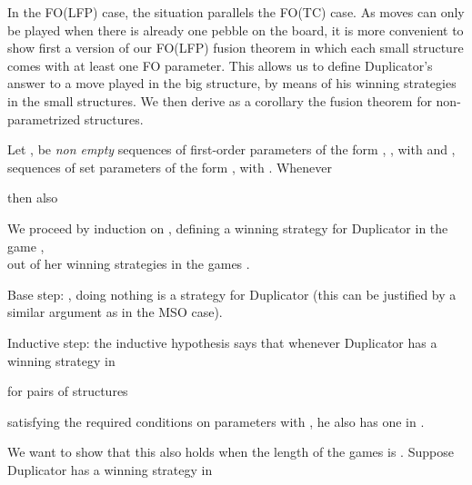 \documentclass{LMCS}
\newcommand{\fo}{\textsf{FO}\xspace}
\newcommand{\mso}{\textsf{MSO}\xspace}
\newcommand{\fotc}{\textsf{FO(TC)}\xspace}
\newcommand{\folfp}{\textsf{FO(LFP)}\xspace}
\begin{document}
In the \folfp case, the situation parallels the \fotc case. As  moves can only be played when there is already one pebble on the board, it is more convenient to show first a version of our \folfp fusion theorem in which each small structure comes with at least one \fo parameter. This allows us to define Duplicator's answer to a  move played in the big structure, by means of his winning strategies in the small structures. We then derive as a corollary the fusion theorem for non-parametrized structures.

\begin{thm}[Fusion Theorem for \folfp]
Let ,  be \emph{non empty} sequences of first-order
parameters of the form , , with
 and ,  sequences of set parameters of
the form ,  with .
Whenever

then also 
\end{thm}

\proof
We proceed by induction on , defining a winning strategy for Duplicator in the game ,\\
 out of her winning strategies in
the games
.

Base step: , doing nothing is a strategy for Duplicator (this can be justified by a similar argument as in the \mso case).

Inductive step: the inductive hypothesis says that whenever Duplicator has a winning strategy
in

for pairs of structures

satisfying the required conditions on parameters with , he also has one in .

We want to show that this also holds when the length of the games
is . Suppose Duplicator has a winning strategy in
\end{document}
